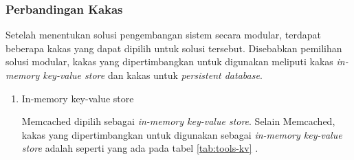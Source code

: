 \subsubsection{Perbandingan Kakas}
Setelah menentukan solusi pengembangan sistem secara modular, terdapat beberapa kakas yang dapat dipilih untuk solusi tersebut. Disebabkan pemilihan solusi modular, kakas yang dipertimbangkan untuk digunakan meliputi kakas \textit{in-memory key-value store} dan kakas untuk \textit{persistent database}.

\begin{enumerate}
    \item In-memory key-value store
    
    Memcached dipilih sebagai \textit{in-memory key-value store}. Selain Memcached, kakas yang dipertimbangkan untuk digunakan sebagai \textit{in-memory key-value store} adalah seperti yang ada pada tabel \ref{tab:tools-kv} \parencite{redis_docs} \parencite{dragonflydb_docs} \parencite{memcached_documentation}.

    \begin{table}[h]
        \centering
        \caption{Perbandingan kakas in-memory key-value store}
        \label{tab:tools-kv}
    \end{table}


\end{enumerate}

